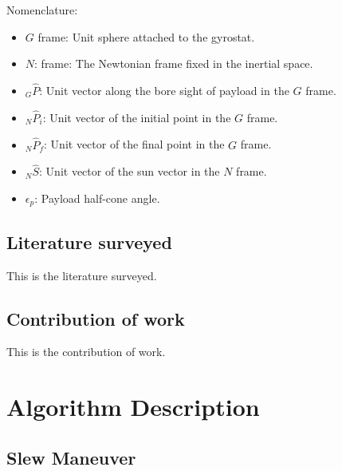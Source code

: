 \documentclass[letterpaper, preprint, paper,11pt]{AAS}	%
\begin{document}
	
	Nomenclature: 
	\begin{itemize}
		\item $G$ frame: Unit sphere attached to the gyrostat.
		\item $N$: frame: The Newtonian frame fixed in the inertial space.
		\item $_G\hat{P}$: Unit vector along the bore sight of payload in the $G$ frame.
		\item $_N\hat{P}_i$: Unit vector of the initial point in the $G$ frame.
		\item $_N\hat{P}_f$: Unit vector of the final point in the $G$ frame.
		\item $_N\hat{S}$: Unit vector of the sun vector in the $N$ frame.
		\item $\epsilon_p$: Payload half-cone angle.
	\end{itemize}
	
	
	\clearpage
	\subsection{Literature surveyed}
	
	This is the literature surveyed. 
	
	\subsection{Contribution of work} 
	
	This is the contribution of work. 
	
	\section{Algorithm Description} 
	
	\subsection{Slew Maneuver} 
	
	
\end{document}

